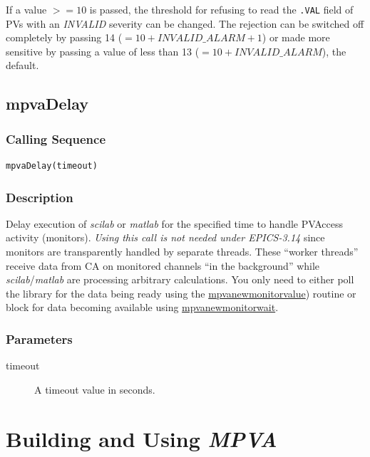 \documentclass{article}
\newcommand{\sca}{\ita{MPVA}}
\newcommand{\scilab}{\ita{scilab}}
\newcommand{\matlab}{\ita{matlab}}
\newcommand{\com}[1]{{\tt #1}}
\newcommand{\pbrk}{\pagebreak[3]}
\newcommand{\pbrkf}{\pagebreak}
\newcommand{\comref}[2]{\hyperref{\com{#1}}{\com{#1} (see }{)}{#2}}
\newcommand{\ita}[1]{\emph{#1}}
\renewcommand{\pbrk}{}
\renewcommand{\pbrkf}{}
\begin{document}
If a value $>=10$ is passed, the threshold for refusing to read the \com{.VAL}
field of PVs with an \ita{INVALID} severity can be changed. The rejection
can be switched off completely by passing 14 ($= 10 + INVALID\_ALARM + 1$)
or made more sensitive by passing a value of less than 13 ($=10 + INVALID\_ALARM$),
the default.

\vspace*{\fill}
\pbrk
\subsection{mpvaDelay}
\label{mpvadelay}
\subsubsection{Calling Sequence}
\begin{verbatim}
mpvaDelay(timeout)
\end{verbatim}
\subsubsection{Description}
Delay execution of \scilab{} or \matlab{} for the specified time
to handle PVAccess activity (monitors). 
{\em Using this call is not needed under EPICS-3.14} since monitors
are transparently handled by separate threads. These ``worker threads''
receive data from CA on monitored channels ``in the background'' while
\scilab{}/\matlab{} are processing arbitrary calculations.
You only need to either poll the library for the data being ready using the
\comref{mpvaNewMonitorValue()}{mpvanewmonitorvalue}) routine
or block for data becoming available using
\comref{mpvaNewMonitorWait}{mpvanewmonitorwait}.

\subsubsection{Parameters}
\begin{description}
\item[timeout]
A timeout value in seconds.
\end{description}

\pbrkf
\section{Building and Using \sca{}}
\end{document}
